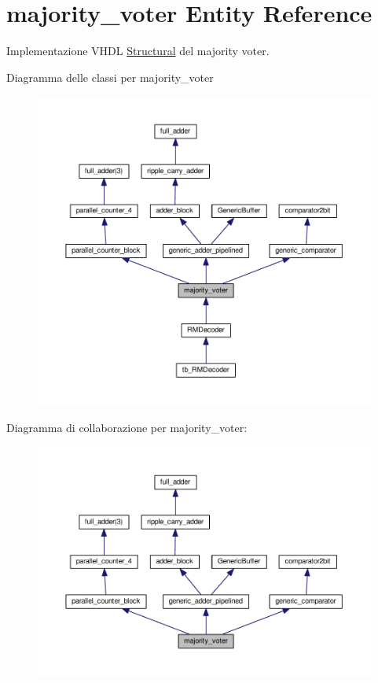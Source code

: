 \hypertarget{classmajority__voter}{\section{majority\+\_\+voter Entity Reference}
\label{classmajority__voter}
}


Implementazione V\+H\+D\+L \hyperlink{classmajority__voter_1_1_structural}{Structural} del majority voter.  




Diagramma delle classi per majority\+\_\+voter\nopagebreak
\begin{figure}[H]
\begin{center}
\leavevmode
\includegraphics[width=350pt]{classmajority__voter__inherit__graph}
\end{center}
\end{figure}


Diagramma di collaborazione per majority\+\_\+voter\+:\nopagebreak
\begin{figure}[H]
\begin{center}
\leavevmode
\includegraphics[width=350pt]{classmajority__voter__coll__graph}
\end{center}
\end{figure}

